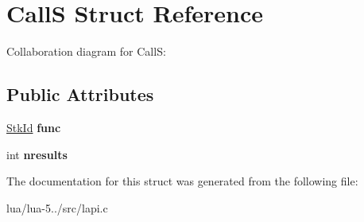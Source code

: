 \hypertarget{struct_call_s}{\section{Call\+S Struct Reference}
\label{struct_call_s}
}


Collaboration diagram for Call\+S\+:
\subsection*{Public Attributes}
\begin{DoxyCompactItemize}
\item 
\hypertarget{struct_call_s_ad175aaaa032f3e446b391f4e04bd1a6b}{\hyperlink{structlua___t_value}{Stk\+Id} {\bfseries func}}\label{struct_call_s_ad175aaaa032f3e446b391f4e04bd1a6b}

\item 
\hypertarget{struct_call_s_ad786e0ae2bf61fad4a46b048830c9569}{int {\bfseries nresults}}\label{struct_call_s_ad786e0ae2bf61fad4a46b048830c9569}

\end{DoxyCompactItemize}


The documentation for this struct was generated from the following file\+:\begin{DoxyCompactItemize}
\item 
lua/lua-\/5../src/lapi.\+c\end{DoxyCompactItemize}
